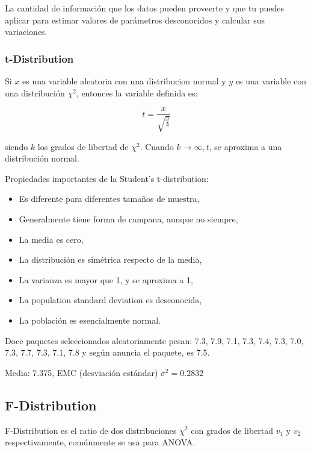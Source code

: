 \documentclass[]{article}
\begin{document}
La cantidad de información que los datos pueden proveerte y que tu puedes aplicar para estimar valores de parámetros desconocidos y calcular sus variaciones.

\subsubsection{t-Distribution}

Si $x$ es una variable aleatoria con una distribucion normal y $y$ es una variable con una distribución $\chi^2$, entonces la variable definida es:

\begin{equation}
 t = \frac{x}{\sqrt{\frac{y}{k}}}
\end{equation}

siendo $k$ los grados de libertad de $\chi^2$. Cuando $k \longrightarrow \infty, t$, se aproxima a una distribución normal.

Propiedades importantes de la Student's t-distribution:
\begin{itemize}
	\item Es diferente para diferentes tamaños de muestra,
	\item Generalmente tiene forma de campana, aunque no siempre,
	\item La media es cero,
	\item La distribución es simétrica respecto de la media,
	\item La varianza es mayor que 1, y se aproxima a 1,
	\item La population standard deviation es desconocida,
	\item La población es esencialmente normal.
\end{itemize}

Doce paquetes seleccionados aleatoriamente pesan: 7.3, 7.9, 7.1, 7.3, 7.4, 7.3, 7.0, 7.3, 7.7, 7.3, 7.1, 7.8 y según anuncia el paquete, es 7.5. 

Media: 7.375, EMC (desviación estándar) $\sigma^2 = 0.2832$

\subsection{F-Distribution}

F-Distribution es el ratio de dos distribuciones $\chi^2$ con grados de libertad $v_1$ y $v_2$ respectivamente, comúnmente se usa para ANOVA.
\end{document}

